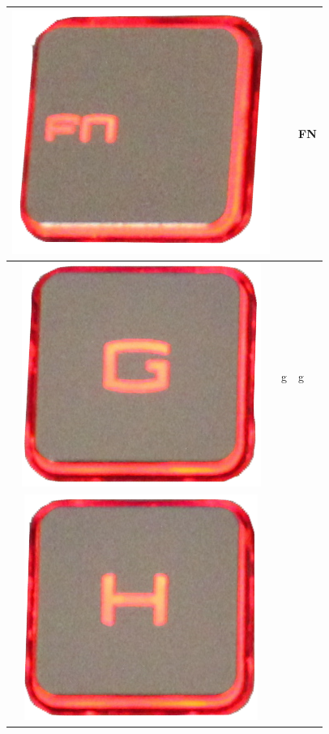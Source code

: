 \begin{longtable}{|cll|}
\begin{minipage}[c]{.4\textwidth}
\includegraphics[scale=0.08]{Images/KeyMapping/FN}
\vspace{0.2cm}
\end{minipage} &  & FN\\
\hline
\begin{minipage}[c]{.4\textwidth}
\vspace{0.2cm}
\includegraphics[scale=0.08]{Images/KeyMapping/g}
\vspace{0.2cm}
\end{minipage} & g & g\\
\hline
\begin{minipage}[c]{.4\textwidth}
\vspace{0.2cm}
\includegraphics[scale=0.08]{Images/KeyMapping/h}

\end{minipage}
\end{longtable}
